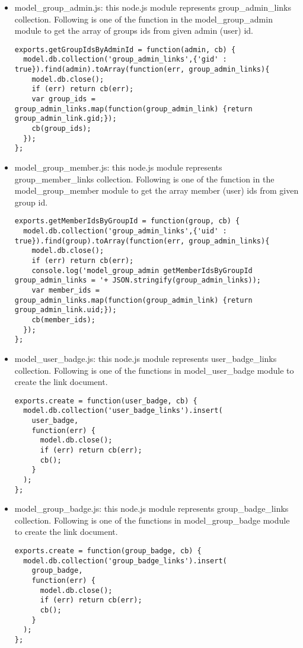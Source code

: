 \begin{itemize}
\item model{\_}group{\_}admin.js: this node.js module represents group{\_}admin{\_}links collection. Following is one of the function in the model{\_}group{\_}admin module to get the array of groups ids from given admin (user) id.

\begin{lstlisting}
exports.getGroupIdsByAdminId = function(admin, cb) {
  model.db.collection('group_admin_links',{'gid' : true}).find(admin).toArray(function(err, group_admin_links){
    model.db.close();
    if (err) return cb(err);
    var group_ids = group_admin_links.map(function(group_admin_link) {return group_admin_link.gid;});
    cb(group_ids);
  });    
};
\end{lstlisting}


\item model{\_}group{\_}member.js: this node.js module represents group{\_}member{\_}links collection. Following is one of the function in the model{\_}group{\_}member module to get the array member (user) ids from given group id.

\begin{lstlisting}
exports.getMemberIdsByGroupId = function(group, cb) {
  model.db.collection('group_admin_links',{'uid' : true}).find(group).toArray(function(err, group_admin_links){
    model.db.close();
    if (err) return cb(err);
    console.log('model_group_admin getMemberIdsByGroupId  group_admin_links = '+ JSON.stringify(group_admin_links));
    var member_ids = group_admin_links.map(function(group_admin_link) {return group_admin_link.uid;});
    cb(member_ids);
  });    
};
\end{lstlisting}
 
\item model{\_}user{\_}badge.js: this node.js module represents user{\_}badge{\_}links collection. Following is one of the functions in model{\_}user{\_}badge module to create the link document.

\begin{lstlisting}
exports.create = function(user_badge, cb) {
  model.db.collection('user_badge_links').insert(
    user_badge,
    function(err) {
      model.db.close();
      if (err) return cb(err); 
      cb();
    }
  );
};
\end{lstlisting}

\item model{\_}group{\_}badge.js: this node.js module represents group{\_}badge{\_}links collection. Following is one of the functions in model{\_}group{\_}badge module to create the link document.

\begin{lstlisting}
exports.create = function(group_badge, cb) {
  model.db.collection('group_badge_links').insert(
    group_badge,
    function(err) {
      model.db.close();
      if (err) return cb(err); 
      cb();
    }
  );
};
\end{lstlisting}

\end{itemize}

